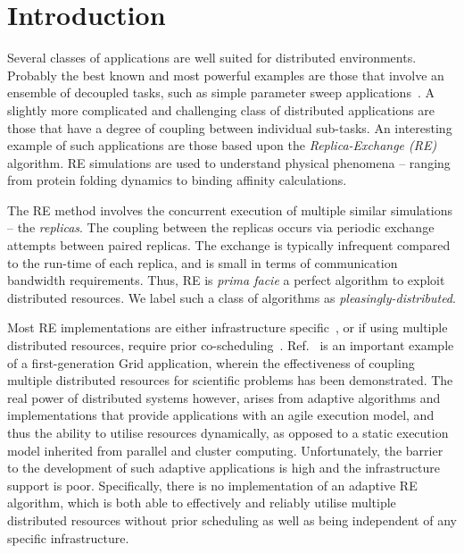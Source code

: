 \documentclass{rspublic}
\begin{document}
\section{Introduction}

Several classes of applications are well suited for distributed
environments. Probably the best known and most powerful examples are
those that involve an ensemble of decoupled tasks, such as simple
parameter sweep applications~\citep{1239909}.  A slightly more
complicated and challenging class of distributed applications are
those that have a degree of coupling between individual sub-tasks.  An
interesting example of such applications are those based upon the
\emph{Replica-Exchange (RE)}~\citep{hansmann,Sugita:1999rm} algorithm.
RE simulations are used to understand physical phenomena -- ranging
from protein folding dynamics to binding affinity calculations.

The RE method involves the concurrent execution of multiple similar
simulations -- the \emph{replicas}. The coupling between the replicas
occurs via periodic exchange attempts between paired replicas. The
exchange is typically infrequent compared to the run-time of each
replica, and is small in terms of communication bandwidth
requirements. Thus, RE is {\it prima facie} a perfect algorithm to
exploit distributed resources. We label such a class of algorithms as
{\it pleasingly-distributed}.

Most RE implementations are either infrastructure
specific~\citep{Woods:2005nx}, or if using multiple distributed
resources, require prior co-scheduling~\citep{repex_mpig}.
Ref.~\citep{repex_mpig} is an important example of a first-generation
Grid application, wherein the effectiveness of coupling multiple
distributed resources for scientific problems has been demonstrated.
The real power of distributed systems however, arises from adaptive
algorithms and implementations that provide applications with an agile
execution model, and thus the ability to utilise resources
dynamically, as opposed to a static execution model inherited from
parallel and cluster computing.  Unfortunately, the barrier to the
development of such adaptive applications is high and the
infrastructure support is poor.
Specifically, there is no implementation of an
adaptive RE algorithm, which is both able to effectively and reliably
utilise multiple distributed resources without prior scheduling as
well as being independent of any specific %
infrastructure.
                      
\end{document}

